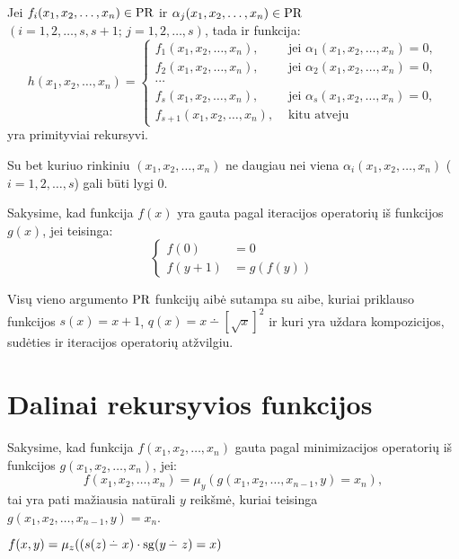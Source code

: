 \begin{prop}
  Jei $f_{i}(x_1,x_2,\dotsc,x_n) \in \mathop{\text{PR}}$ ir 
  $\alpha_{j}(x_1,x_2,\dotsc,x_n) \in \mathop{\text{PR}}$ 
  $(i=1,2,\dotsc,s,s+1;\,j=1,2,\dotsc,s)$, tada ir funkcija:
  \[
  h(x_1,x_2,\dotsc,x_n) =%
  \begin{cases}
    f_{1}(x_1,x_2,\dotsc,x_n), 
      &\text{ jei } \alpha_{1}(x_1,x_2,\dotsc,x_n)=0,\\
    f_{2}(x_1,x_2,\dotsc,x_n), 
      &\text{ jei } \alpha_{2}(x_1,x_2,\dotsc,x_n)=0,\\
    \cdots & {} \\
    f_{s}(x_1,x_2,\dotsc,x_n), 
      &\text{ jei } \alpha_{s}(x_1,x_2,\dotsc,x_n)=0,\\
    f_{s+1}(x_1,x_2,\dotsc,x_n), 
      &\text{ kitu atveju }
  \end{cases}
  \]
  yra primityviai rekursyvi.
  \begin{note}
    Su bet kuriuo rinkiniu $(x_1,x_2,\dotsc,x_n)$ ne daugiau nei viena
    $\alpha_{i}(x_1,x_2,\dotsc,x_n)$ ($i=1,2,\dotsc,s$) gali būti lygi 0.
  \end{note}
\end{prop}

\begin{defn}
  Sakysime, kad funkcija $f(x)$ yra gauta pagal iteracijos operatorių iš
  funkcijos $g(x)$, jei teisinga:
  \[
  \begin{cases}
    f(0) &= 0 \\
    f(y+1) &= g(f(y))
  \end{cases}
  \]
\end{defn}

\begin{prop}
  \label{pr1arg}
  Visų vieno argumento $\mathop{\text{PR}}$ funkcijų aibė sutampa su aibe, kuriai
  priklauso funkcijos $s(x) = x+1$, 
  $q(x) = x \dotminus \left[ \sqrt{x} \right]^2$ ir kuri yra 
  uždara kompozicijos, sudėties ir iteracijos operatorių atžvilgiu.
\end{prop}

\section{Dalinai rekursyvios funkcijos}

\begin{defn}
  Sakysime, kad funkcija $f(x_1,x_2,\dotsc,x_n)$ gauta pagal minimizacijos
  operatorių iš funkcijos $g(x_1,x_2,\dotsc,x_n)$, jei:
  \[
  f(x_1,x_2,\dotsc,x_n) = \mu_{y}(g(x_1,x_2,\dotsc,x_{n-1},y) = x_n),
  \]
  tai yra pati mažiausia natūrali $y$ reikšmė, kuriai teisinga
  $g(x_1,x_2,\dotsc,x_{n-1},y) = x_n$.

  \begin{exmp}
    $f(x,y) = \mu_{z}((s(z)\mathop{\mbox{$-^{\hspace{-.5em}\cdot}\,\,$}} x)\cdot \operatorname{sg}(y \mathop{\mbox{$-^{\hspace{-.5em}\cdot}\,\,$}} z)=x)$
  \end{exmp}
\end{defn}

